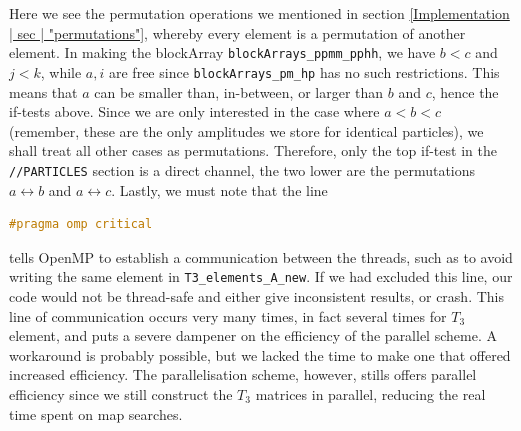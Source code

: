 \documentclass[10pt,twoside]{report}
\begin{document}
		Here we see the permutation operations we mentioned in section \ref{Implementation | sec | "permutations"}, whereby every element is a permutation of another element. In making the blockArray \texttt{blockArrays\_ppmm\_pphh}, we have $b<c$ and $j<k$,  while  $a,i$ are free since \texttt{blockArrays\_pm\_hp} has no such restrictions. This means that $a$ can be smaller than, in-between, or larger than $b$ and $c$, hence the if-tests above. Since we are only interested in the case where $a<b<c$ (remember, these are the only amplitudes we store for identical particles), we shall treat all other cases as permutations. Therefore, only the top if-test in the \texttt{//PARTICLES} section is a direct channel, the two lower are the permutations $a\leftrightarrow b$ and $a\leftrightarrow c$. Lastly, we must note that the line 
		
		\begin{lstlisting}[language=C++]
		#pragma omp critical
		\end{lstlisting}
		
		\noindent tells OpenMP to establish a communication between the threads, such as to avoid writing the same element in \texttt{T3\_elements\_A\_new}. If we had excluded this line, our code would not be thread-safe and either give inconsistent results, or crash. This line of communication occurs very many times, in fact several times for $T_3$ element, and puts a severe dampener on the efficiency of the parallel scheme. A workaround is probably possible, but we lacked the time to make one that offered increased efficiency. The parallelisation scheme, however, stills offers parallel efficiency since we still construct the $T_3$ matrices in parallel, reducing the real time spent on map searches.
	
\end{document}
